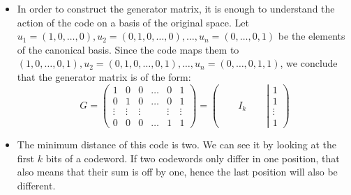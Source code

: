 \begin{solution}
\begin{itemize}
\item In order to construct the generator matrix, it is enough to understand the action of the code on a basis of the original space. Let $u_1=(1,0,\ldots,0),u_2=(0,1,0,\ldots,0),\ldots,u_n=(0,\ldots,0,1)$ be the elements of the canonical basis. Since the code maps them to $(1,0,\ldots,0,1),u_2=(0,1,0,\ldots,0,1),\ldots,u_n=(0,\ldots,0,1,1)$, we conclude that the generator matrix is of the form: 
\begin{equation}
G=\begin{pmatrix}
1&0&0&\ldots&0&1\\
0&1&0&\ldots&0&1\\
\vdots &\vdots&\vdots & &\vdots &\vdots\\
0&0&0&\ldots&1&1
\end{pmatrix}=\left(\qquad I_k\qquad\left| \begin{matrix}1\\1\\ \vdots\\ 1\end{matrix}\right.\right)
\end{equation}
\item The minimum distance of this code is two. We can see it by looking at the first $k$ bits of a codeword. If two codewords only differ in one position, that also means that their sum is off by one, hence the last position will also be different. 
\end{itemize}
\end{solution}

